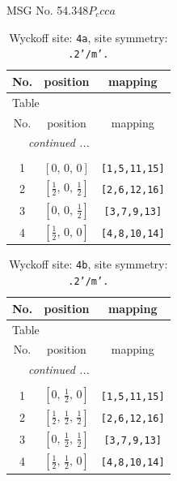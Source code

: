 \documentclass[fleqn,8pt]{jsarticle}
\begin{document}
\setcounter{MaxMatrixCols}{32}

\renewcommand{\tablename}{Table~}
\renewcommand{\figurename}{Figure~}
\begin{center}
\LARGE
MSG No. 54.348\quad$P_{c}cca$
\end{center}
\renewcommand{\arraystretch}{1.2}
\begin{longtable}{ccc}
\caption{Wyckoff site: {\tt 4a}, site symmetry: {\tt .2'/m'.}}
 \\
 \hline \hline
No. & position & mapping \\ \hline \endfirsthead

\multicolumn{2}{l}{\tablename\ \thetable{}} \\
 \hline \hline
No. & position & mapping \\ \hline \endhead

 \hline \hline
\multicolumn{2}{r}{\footnotesize\it continued ...} \\ \endfoot

 \hline \hline
\multicolumn{2}{r}{} \\ \endlastfoot

1 & $\left[ 0,\, 0,\, 0 \right]$ & {\tt [1,5,11,15]} \\ \hline
2 & $\left[ \frac{1}{2},\, 0,\, \frac{1}{2} \right]$ & {\tt [2,6,12,16]} \\ \hline
3 & $\left[ 0,\, 0,\, \frac{1}{2} \right]$ & {\tt [3,7,9,13]} \\ \hline
4 & $\left[ \frac{1}{2},\, 0,\, 0 \right]$ & {\tt [4,8,10,14]} \\
\end{longtable}
\renewcommand{\arraystretch}{1.2}
\begin{longtable}{ccc}
\caption{Wyckoff site: {\tt 4b}, site symmetry: {\tt .2'/m'.}}
 \\
 \hline \hline
No. & position & mapping \\ \hline \endfirsthead

\multicolumn{2}{l}{\tablename\ \thetable{}} \\
 \hline \hline
No. & position & mapping \\ \hline \endhead

 \hline \hline
\multicolumn{2}{r}{\footnotesize\it continued ...} \\ \endfoot

 \hline \hline
\multicolumn{2}{r}{} \\ \endlastfoot

1 & $\left[ 0,\, \frac{1}{2},\, 0 \right]$ & {\tt [1,5,11,15]} \\ \hline
2 & $\left[ \frac{1}{2},\, \frac{1}{2},\, \frac{1}{2} \right]$ & {\tt [2,6,12,16]} \\ \hline
3 & $\left[ 0,\, \frac{1}{2},\, \frac{1}{2} \right]$ & {\tt [3,7,9,13]} \\ \hline
4 & $\left[ \frac{1}{2},\, \frac{1}{2},\, 0 \right]$ & {\tt [4,8,10,14]} \\
\end{longtable}
\end{document}
